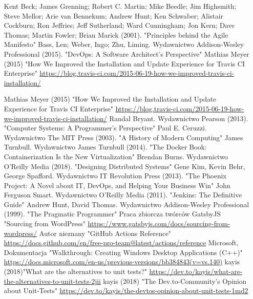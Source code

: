 \documentclass[twoside]{projektInzynierskiMS}
\begin{document}
\begin{thebibliography}{12}

 Kent Beck; James Grenning; Robert C. Martin; Mike Beedle; Jim Highsmith; Steve Mellor; Arie van Bennekum; Andrew Hunt; Ken Schwaber; Alistair Cockburn; Ron Jeffries; Jeff Sutherland; Ward Cunningham; Jon Kern; Dave Thomas; Martin Fowler; Brian Marick (2001). "Principles behind the Agile Manifesto"
 Bass, Len; Weber, Ingo; Zhu, Liming. Wydawnictwo Addison-Wesley Professional (2015). "DevOps: A Software Architect's Perspective"
 Mathias Meyer (2015)  "How We Improved the Installation and Update Experience for Travis CI Enterprise" \url{https://blog.travis-ci.com/2015-06-19-how-we-improved-travis-ci-installation/}

 Mathias Meyer (2015)  "How We Improved the Installation and Update Experience for Travis CI Enterprise" \url{https://blog.travis-ci.com/2015-06-19-how-we-improved-travis-ci-installation/}
 Randal Bryant. Wydawnictwo Pearson (2013). "Computer Systems: A Programmer's Perspective"
 Paul E. Ceruzzi. Wydawnictwo The MIT Press (2003). "A History of Modern Computing"
 James Turnbull. Wydawnictwo James Turnbull (2014). "The Docker Book: Containerization Is the New Virtualization"
 Brendan Burns. Wydawnictwo O'Reilly Media (2018). "Designing Distributed Systems"
 Gene Kim, Kevin Behr, George Spafford. Wydawnictwo IT Revolution Press (2013). "The Phoenix Project: A Novel about IT, DevOps, and Helping Your Business Win"
 John Ferguson Smart. Wydawnictwo O'Reilly Media (2011). "Jenkins: The Definitive Guide"
 Andrew Hunt, David Thomas. Wydawnictwo Addison-Wesley Professional (1999). "The Pragmatic Programmer"
 Praca zbiorcza twórców GatsbyJS "Sourcing from WordPress" \url{https://www.gatsbyjs.com/docs/sourcing-from-wordpress/}
 Autor nieznany "GitHub Actions Reference" \url{https://docs.github.com/en/free-pro-team@latest/actions/reference}
 Microsoft, Dokumentacja "Walkthrough: Creating Windows Desktop Applications (C++)" \url{https://docs.microsoft.com/en-us/previous-versions/bb384843(v=vs.140)}
 kayis (2018)"What are the alternatives to unit tests?" \url{https://dev.to/kayis/what-are-the-alternatives-to-unit-tests-2jii}
 kayis (2018) "The Dev.to-Community's Opinion about Unit-Tests" \url{https://dev.to/kayis/the-devtos-opinion-about-unit-tests-1md2}

\end{thebibliography}
\end{document}
